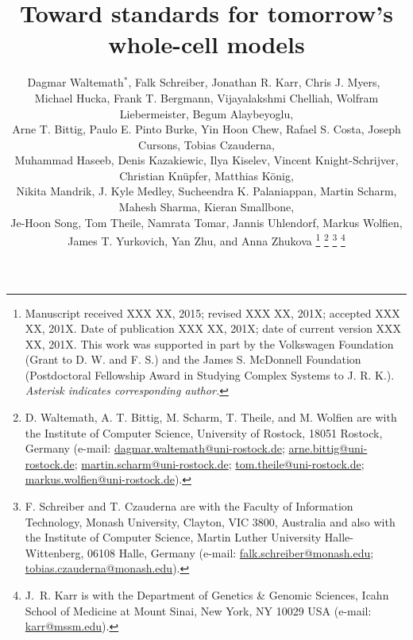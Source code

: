 \documentclass[journal,transmag]{IEEEtran}
\newcommand{\email}[1]{\href{mailto:#1}{#1}}
\begin{document}
\nocite{IEEEBSTcontrol}

\title{Toward standards for tomorrow's whole-cell models}

\author{
    Dagmar Waltemath$^*$,
    Falk Schreiber, 
    Jonathan R. Karr, 
    Chris J. Myers,~ \\
    Michael Hucka,
    Frank T. Bergmann,
    Vijayalakshmi Chelliah,
    Wolfram Liebermeister,
    Begum Alaybeyoglu,\\
    Arne T. Bittig,
    Paulo E. Pinto Burke, 
    Yin Hoon Chew,
    Rafael S. Costa,
    Joseph Cursons, 
    Tobias Czauderna,\\
    Muhammad Haseeb,
    Denis Kazakiewic, 
    Ilya Kiselev,
    Vincent Knight-Schrijver,
    Christian Kn\"{u}pfer,
    Matthias K\"{o}nig,\\
    Nikita Mandrik,
    J. Kyle Medley,
    Sucheendra K. Palaniappan,
    Martin Scharm,
    Mahesh Sharma,
    Kieran Smallbone,\\
    Je-Hoon Song,
    Tom Theile,
    Namrata Tomar,
    Jannis Uhlendorf,
    Markus Wolfien,\\
    James T. Yurkovich,
    Yan Zhu, and
    Anna Zhukova
    \thanks{
        Manuscript received XXX XX, 2015; revised XXX XX, 201X; accepted XXX XX, 201X. Date of publication XXX XX, 201X; date of current version XXX XX, 201X.
        This work was supported in part by the Volkswagen Foundation (Grant to D. W. and F. S.) and the James S. McDonnell Foundation (Postdoctoral Fellowship Award in Studying Complex Systems to J. R. K.).
        \textit{Asterisk indicates corresponding author.}
    }
    \thanks{D. Waltemath, A. T. Bittig, M. Scharm, T. Theile, and M. Wolfien are with the Institute of Computer Science, University of Rostock, 18051 Rostock, Germany (e-mail: \email{dagmar.waltemath@uni-rostock.de}; \email{arne.bittig@uni-rostock.de}; \email{martin.scharm@uni-rostock.de}; \email{tom.theile@uni-rostock.de}; \email{markus.wolfien@uni-rostock.de}).}
    \thanks{F. Schreiber and T. Czauderna are with the Faculty of Information Technology, Monash University, Clayton, VIC 3800, Australia and also with the Institute of Computer Science, Martin Luther University Halle-Wittenberg, 06108 Halle, Germany (e-mail: \email{falk.schreiber@monash.edu}; \email{tobias.czauderna@monash.edu}).}
    \thanks{J.~R. Karr is with the Department of Genetics \& Genomic Sciences, Icahn School of Medicine at Mount Sinai, New York, NY 10029 USA (e-mail: \email{karr@mssm.edu}).}
}
\end{document}
